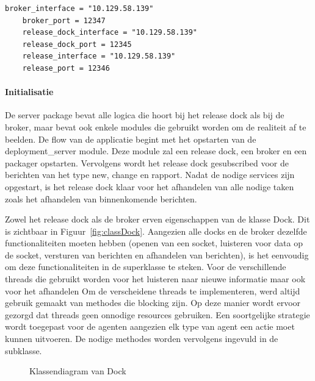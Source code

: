 \begin{minipage}{\linewidth}
\begin{center}
\begin{lstlisting}[caption={Parameters voor server en broker},label={list:startServer}]
    broker_interface = "10.129.58.139"
    broker_port = 12347
    release_dock_interface = "10.129.58.139"
    release_dock_port = 12345
    release_interface = "10.129.58.139"
    release_port = 12346
\end{lstlisting}
\end{center}
\end{minipage}

\paragraph{Initialisatie} 
De server package bevat alle logica die hoort bij het release dock als bij de broker, maar bevat ook enkele modules die gebruikt worden om de realiteit af te beelden.
De flow van de applicatie begint met het opstarten van de deployment\_server module.
Deze module zal een release dock, een broker en een packager opstarten.
Vervolgens wordt het release dock gesubscribed voor de berichten van het type new, change en rapport.
Nadat de nodige services zijn opgestart, is het release dock klaar voor het afhandelen van alle nodige taken zoals het afhandelen van binnenkomende berichten.

Zowel het release dock als de broker erven eigenschappen van de klasse Dock.
Dit is zichtbaar in Figuur~\vref{fig:classDock}.
Aangezien alle docks en de broker dezelfde functionaliteiten moeten hebben (openen van een socket, luisteren voor data op de socket, versturen van berichten en afhandelen van berichten), is het eenvoudig om deze functionaliteiten in de superklasse te steken.
Voor de verschillende threads die gebruikt worden voor het luisteren naar nieuwe informatie maar ook voor het afhandelen Om de verscheidene threads te implementeren, werd altijd gebruik gemaakt van methodes die blocking zijn.
Op deze manier wordt ervoor gezorgd dat threads geen onnodige resources gebruiken.
Een soortgelijke strategie wordt toegepast voor de agenten aangezien elk type van agent een actie moet kunnen uitvoeren.
De nodige methodes worden vervolgens ingevuld in de subklasse. 

\begin{figure}[!ht]
\centering
{}
\caption{Klassendiagram van Dock}
\label{fig:classDock}
\end{figure}

